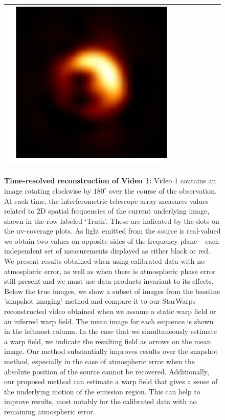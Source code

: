 \begin{figure}
\begin{center}
\begin{tabular}{  c | c | c  c  c  c  c c }
			\includegraphics[height=0.12\linewidth]{figures/starwarps_results/rotation30/amp-bispectrum_sol1/best/frames/mean_noaxis_29.pdf}  
			\\ \hline  	
		\end{tabular}
		\caption{ {\footnotesize {\bf Time-resolved reconstruction of Video 1:} Video 1 contains an image rotating clockwise by $180^{\circ}$ over the course of the observation. At each time, the interferometric telescope array measures values related to 2D spatial frequencies of the current underlying image, shown in the row labeled `Truth'. These are indicated by the dots on the uv-coverage plots. As light emitted from the source is real-valued we obtain two values on opposite sides of the frequency plane -- each independent set of measurements displayed as either black or red. We present results obtained when using calibrated data with no atmospheric error, as well as when there is atmospheric phase error still present and we must use data products invariant to its effects.
			Below the true images, we show a subset of images from the baseline 'snapshot imaging' method and compare it to our StarWarps reconstructed video obtained when we assume a static warp field or an inferred warp field. The mean image for each sequence is shown in the leftmost column. In the case that we simultaneously estimate a warp field, we indicate the resulting field as arrows on the mean image. Our method substantially improves results over the snapshot method, especially in the case of atmospheric error when the absolute position of the source cannot be recovered. Additionally, our proposed method can estimate a warp field that gives a sense of the underlying motion of the emission region. This can help to improve results, most notably for the calibrated data with no remaining atmospheric error. } }

\end{center}
\end{figure}
